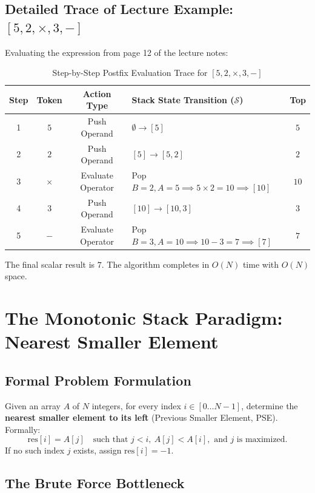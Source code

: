 \documentclass[10pt,journal,compsoc,onecolumn]{IEEEtran}
\begin{document}
\subsection{Detailed Trace of Lecture Example: $[5, 2, \times, 3, -]$}

Evaluating the expression from page 12 of the lecture notes:
\begin{table}[h]
\centering
\caption{Step-by-Step Postfix Evaluation Trace for $[5, 2, \times, 3, -]$}
\label{tab:postfix_trace}
\begin{tabular}{@{}ccclc@{}}
\toprule
\textbf{Step} & \textbf{Token} & \textbf{Action Type} & \textbf{Stack State Transition ($\mathcal{S}$)} & \textbf{Top} \\ \midrule
1 & $5$ & Push Operand & $\emptyset \to [5]$ & $5$ \\
2 & $2$ & Push Operand & $[5] \to [5, 2]$ & $2$ \\
3 & $\times$ & Evaluate Operator & Pop $B = 2, A = 5 \implies 5 \times 2 = 10 \implies [10]$ & $10$ \\
4 & $3$ & Push Operand & $[10] \to [10, 3]$ & $3$ \\
5 & $-$ & Evaluate Operator & Pop $B = 3, A = 10 \implies 10 - 3 = 7 \implies [7]$ & $7$ \\ \bottomrule
\end{tabular}
\end{table}

The final scalar result is \textbf{$7$}. The algorithm completes in $O(N)$ time with $O(N)$ space.

\section{The Monotonic Stack Paradigm: Nearest Smaller Element}
\label{sec:monotonic}

\subsection{Formal Problem Formulation}

Given an array $A$ of $N$ integers, for every index $i \in [0 \dots N-1]$, determine the \textbf{nearest smaller element to its left} (Previous Smaller Element, PSE). Formally:
\[
\text{res}[i] = A[j] \quad \text{such that } j < i, \ A[j] < A[i], \text{ and } j \text{ is maximized.}
\]
If no such index $j$ exists, assign $\text{res}[i] = -1$.

\subsection{The Brute Force Bottleneck}
\end{document}
